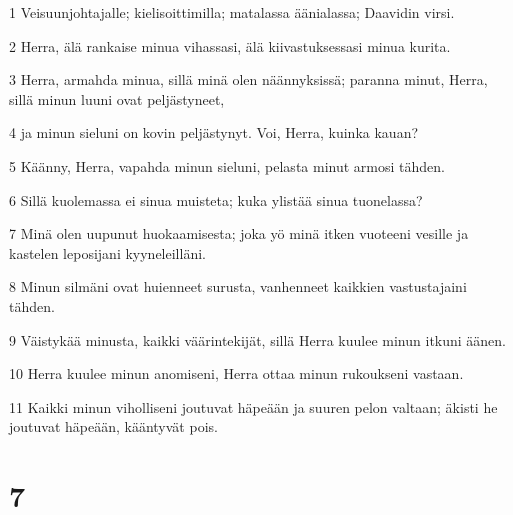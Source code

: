 \par 1 Veisuunjohtajalle; kielisoittimilla; matalassa äänialassa; Daavidin virsi.
\par 2 Herra, älä rankaise minua vihassasi, älä kiivastuksessasi minua kurita.
\par 3 Herra, armahda minua, sillä minä olen näännyksissä; paranna minut, Herra, sillä minun luuni ovat peljästyneet,
\par 4 ja minun sieluni on kovin peljästynyt. Voi, Herra, kuinka kauan?
\par 5 Käänny, Herra, vapahda minun sieluni, pelasta minut armosi tähden.
\par 6 Sillä kuolemassa ei sinua muisteta; kuka ylistää sinua tuonelassa?
\par 7 Minä olen uupunut huokaamisesta; joka yö minä itken vuoteeni vesille ja kastelen leposijani kyyneleilläni.
\par 8 Minun silmäni ovat huienneet surusta, vanhenneet kaikkien vastustajaini tähden.
\par 9 Väistykää minusta, kaikki väärintekijät, sillä Herra kuulee minun itkuni äänen.
\par 10 Herra kuulee minun anomiseni, Herra ottaa minun rukoukseni vastaan.
\par 11 Kaikki minun viholliseni joutuvat häpeään ja suuren pelon valtaan; äkisti he joutuvat häpeään, kääntyvät pois.

\chapter{7}

